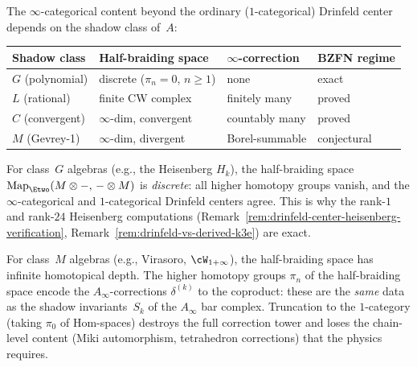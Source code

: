 \begin{remark}
\label{rem:infty-cat-shadow-class}
The $\infty$-categorical content beyond the ordinary ($1$-categorical)
Drinfeld center depends on the shadow class of~$A$:
\begin{center}
\begin{tabular}{llll}
\toprule
Shadow class & Half-braiding space & $\infty$-correction & BZFN regime \\
\midrule
$G$ (polynomial) & discrete ($\pi_n = 0$, $n \geq 1$) & none & exact \\
$L$ (rational) & finite CW complex & finitely many & proved \\
$C$ (convergent) & $\infty$-dim, convergent & countably many & proved \\
$M$ (Gevrey-1) & $\infty$-dim, divergent & Borel-summable & conjectural \\
\bottomrule
\end{tabular}
\end{center}
For class~$G$ algebras (e.g., the Heisenberg $H_k$), the
half-braiding space $\mathrm{Map}_{\Etwo}(M \otimes {-},\, {-} \otimes M)$
is \emph{discrete}: all higher homotopy groups vanish, and
the $\infty$-categorical and $1$-categorical Drinfeld centers agree.
This is why the rank-$1$ and rank-$24$ Heisenberg computations
(Remark~\ref{rem:drinfeld-center-heisenberg-verification},
Remark~\ref{rem:drinfeld-vs-derived-k3e}) are exact.

For class~$M$ algebras (e.g., Virasoro, $\cW_{1+\infty}$), the
half-braiding space has infinite homotopical depth. The higher
homotopy groups $\pi_n$ of the half-braiding space encode the
$A_\infty$-corrections $\delta^{(k)}$ to the coproduct: these are
the \emph{same} data as the shadow invariants~$S_k$ of the
$A_\infty$ bar complex. Truncation to the $1$-category (taking
$\pi_0$ of Hom-spaces) destroys the full correction tower and
loses the chain-level content (Miki automorphism, tetrahedron
corrections) that the physics requires.
\end{remark}

